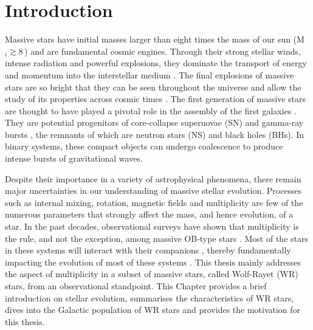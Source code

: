 \chapter{Introduction}\label{ch:introduction}


Massive stars have initial masses larger than eight times the mass of our sun (M$_i \gtrsim 8$\,\Msun{}) and are fundamental cosmic engines. Through their strong stellar winds, intense radiation and powerful explosions, they dominate the transport of energy and momentum into the interstellar medium \citep[][]{mac_low_distribution_2005}. The final explosions of massive stars are so bright that they can be seen throughout the universe and allow the study of its properties across cosmic times \citep{tanvir_-ray_2009}. The first generation of massive stars are thought to have played a pivotal role in the assembly of the first galaxies \citep{bromm_first_2004,robertson_early_2010}. They are potential progenitors of core-collapse supernovae (SN) and gamma-ray bursts \citep{woosley_supernova_2006}, the remnants of which are neutron stars (NS) and black holes (BHs). In binary systems, these compact objects can undergo coalescence to produce intense bursts of gravitational waves.

Despite their importance in a variety of astrophysical phenomena, there remain major uncertainties in our understanding of massive stellar evolution. Processes such as internal mixing, rotation, magnetic fields and multiplicity are few of the numerous parameters that strongly affect the mass, and hence evolution, of a star. In the past decades, observational surveys have shown that multiplicity is the rule, and not the exception, among massive OB-type stars \citep{mason_iccd_1998,mason_high_2009,sana_binary_2012,sana_vlt-flames_2013,sana_southern_2014,kobulnicky_toward_2014,barba_own_2014,dunstall_vlt-flames_2015,maiz_apellaniz_galactic_2016,maiz_apellaniz_monos_2019,almeida_tarantula_2017,banyard_observed_2022,villasenor_b-type_2021}. Most of the stars in these systems will interact with their companions \citep{fryer_constraints_2007,sana_binary_2012,sana_vlt-flames_2013,dunstall_vlt-flames_2015}, thereby fundamentally impacting the evolution of most of these systems \citep{paczynski_evolution_1967,pols_case_1994,1998Vanbeveren_popsynth,2014deMink_mergers}. This thesis mainly addresses the aspect of multiplicity in a subset of massive stars, called Wolf-Rayet (WR) stars, from an observational standpoint. This Chapter provides a brief introduction on stellar evolution, summarises the characteristics of WR stars, dives into the Galactic population of WR stars and provides the motivation for this thesis.

